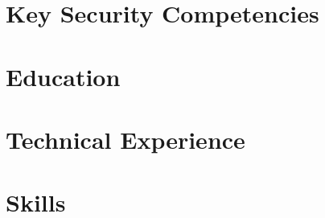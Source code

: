 \documentclass[letter,10pt]{article}
\begin{document}
%
\section{Key Security Competencies}

\section{Education}

\section{Technical Experience}



\section{Skills}

\end{document}
